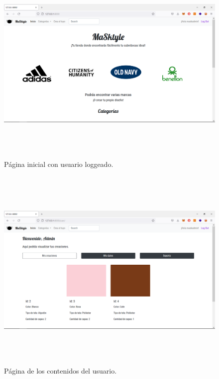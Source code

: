 \documentclass[letterpaper,12pt]{article}
\begin{document}
\begin{figure}[H]
	\includegraphics[width=18cm, height=10cm]{9}
	\centering
	\caption{Página inicial con usuario loggeado.}
\end{figure}
\begin{figure}[H]
	\includegraphics[width=18cm, height=10cm]{10}
	\centering
	\caption{Página de los contenidos del usuario.}
\end{figure}
\end{document}
